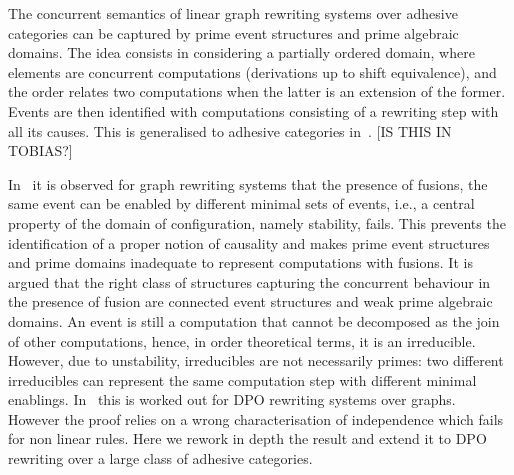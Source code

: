The concurrent semantics of linear graph rewriting systems over
adhesive categories can be captured by prime event structures and
prime algebraic domains. The idea consists in considering a partially
ordered domain, where elements are concurrent computations
(derivations up to shift equivalence), and the order relates two
computations when the latter is an extension of the former.
%
Events are then identified with computations consisting of a rewriting
step with all its causes. This is generalised to adhesive categories
in~\cite{heindel2009category}. [IS THIS IN TOBIAS?]

In~\cite{baldan2017domains} it is observed for graph rewriting systems that the presence of fusions, the same event can be enabled by different minimal sets of events, i.e., a central property of the domain of configuration, namely stability, fails. This prevents the identification of a proper notion of causality and makes prime event structures and prime domains inadequate to represent computations with fusions. It is argued that the right class of structures capturing the concurrent behaviour in the presence of fusion are connected event structures and weak prime algebraic domains.
%
An event is still a computation that cannot be decomposed
as the join of other computations, hence, in order theoretical terms,
it is an irreducible.
%
However, due to unstability, irreducibles are not necessarily primes:
two different irreducibles can represent the same computation step
with different minimal enablings.  In~\cite{baldan2017domains} this
is worked out for DPO rewriting systems over graphs. However the proof
relies on a wrong characterisation of independence which fails for non
linear rules. Here we rework in depth the result and extend it to DPO
rewriting over a large class of adhesive categories.